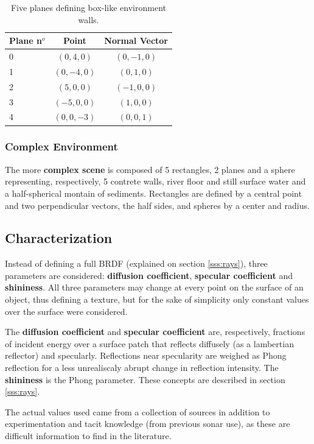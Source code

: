 \begin{table}[ht]
\centering
\begin{tabular}{lcc}
Plane n$^o$ & Point & Normal Vector \\
\hline
0 & $( 0, 4, 0)$ & $( 0,-1, 0)$  \\
1 & $( 0,-4, 0)$ & $( 0, 1, 0)$  \\
2 & $( 5, 0, 0)$ & $(-1, 0, 0)$  \\
3 & $(-5, 0, 0)$ & $( 1, 0, 0)$  \\
4 & $( 0, 0,-3)$ & $( 0, 0, 1)$  \\
\end{tabular}
\caption{Five planes defining box-like environment walls.}
\end{table}

\subsubsection{Complex Environment}
The more \textbf{complex scene} is composed of 5 rectangles, 2 planes and a sphere
representing, respectively, 5 contrete walls, river floor and still surface
water and a half-spherical montain of sediments. Rectangles are defined by a
central point and two perpendicular vectors, the half sides, and spheres by a
center and radius.

\subsection{Characterization}
\label{ss:characterization}

Instead of defining a full BRDF (explained on section
\ref{sss:rays}), three parameters are considered: \textbf{diffusion coefficient},
\textbf{specular coefficient} and \textbf{shininess}. All three parameters may
change at every point on the surface of an object, thus defining a texture, but
for the sake of simplicity only constant values over the surface were
considered.

The \textbf{diffusion coefficient} and \textbf{specular coefficient} are,
respectively, fractions of incident energy over a surface patch that reflects
diffusely (as a lambertian reflector) and specularly. Reflections near
specularity are weighed as Phong reflection for a less unrealiscaly abrupt
change in reflection intensity. The \textbf{shininess} is the Phong parameter.
These concepts are described in section \ref{sss:rays}.

The actual values used came from a collection of sources in addition to
experimentation and tacit knowledge (from previous sonar use), as these are
difficult information to find in the literature.

